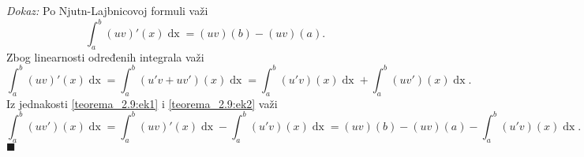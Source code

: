 \documentclass{article}
\DeclareMathOperator{\dx}{dx}
\begin{document}
\textit{Dokaz:} Po Njutn-Lajbnicovoj formuli važi
\begin{equation}
    \label{teorema_2.9:ek1}
    \displaystyle\int^b_a \left(uv\right)'\left(x\right)\dx = \left(uv\right)\left(b\right) - \left(uv\right)\left(a\right).
\end{equation}
Zbog linearnosti određenih integrala važi
\begin{equation}
    \label{teorema_2.9:ek2}
    \displaystyle\int^b_a \left(uv\right)'\left(x\right)\dx = \int^b_a\left(u'v + uv'\right)\left(x\right)\dx = \int^b_a\left(u'v\right)\left(x\right)\dx + \int^b_a\left(uv'\right)\left(x\right)\dx.
\end{equation}
Iz jednakosti \eqref{teorema_2.9:ek1} i \eqref{teorema_2.9:ek2} važi
$$\int^b_a\left(uv'\right)\left(x\right)\dx=\displaystyle\int^b_a \left(uv\right)'\left(x\right)\dx - \int^b_a\left(u'v\right)\left(x\right)\dx= \left(uv\right)\left(b\right) - \left(uv\right)\left(a\right) - \int^b_a\left(u'v\right)\left(x\right)\dx.$$
\null\hfill $\blacksquare$\par
\end{document}
